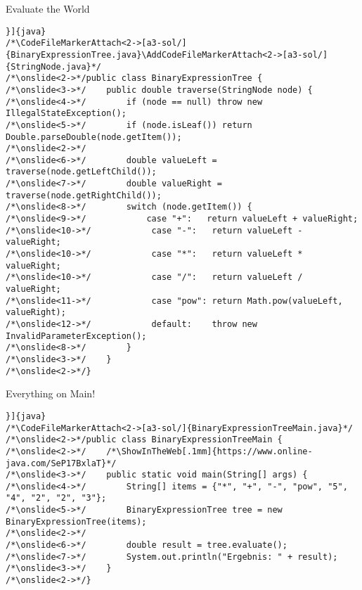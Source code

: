 {\begin{frame}[fragile,c]{Evaluate the World}
\SetupLstHl{}\vspace*{-.25\baselineskip}
\begin{verbatim}}]{java}
/*\CodeFileMarkerAttach<2->[a3-sol/]{BinaryExpressionTree.java}\AddCodeFileMarkerAttach<2->[a3-sol/]{StringNode.java}*/
/*\onslide<2->*/public class BinaryExpressionTree {
/*\onslide<3->*/    public double traverse(StringNode node) {
/*\onslide<4->*/        if (node == null) throw new IllegalStateException();
/*\onslide<5->*/        if (node.isLeaf()) return Double.parseDouble(node.getItem());
/*\onslide<2->*/
/*\onslide<6->*/        double valueLeft = traverse(node.getLeftChild());
/*\onslide<7->*/        double valueRight = traverse(node.getRightChild());
/*\onslide<8->*/        switch (node.getItem()) {
/*\onslide<9->*/            case "+":   return valueLeft + valueRight;
/*\onslide<10->*/            case "-":   return valueLeft - valueRight;
/*\onslide<10->*/            case "*":   return valueLeft * valueRight;
/*\onslide<10->*/            case "/":   return valueLeft / valueRight;
/*\onslide<11->*/            case "pow": return Math.pow(valueLeft, valueRight);
/*\onslide<12->*/            default:    throw new InvalidParameterException();
/*\onslide<8->*/        }
/*\onslide<3->*/    }
/*\onslide<2->*/}
\end{verbatim}
\end{frame}

\begin{frame}[fragile,c]{Everything on Main!}
\SetupLstHl{}
\begin{verbatim}}]{java}
/*\CodeFileMarkerAttach<2->[a3-sol/]{BinaryExpressionTreeMain.java}*/
/*\onslide<2->*/public class BinaryExpressionTreeMain {
/*\onslide<2->*/    /*\ShowInTheWeb[.1mm]{https://www.online-java.com/SeP17BxlaT}*/
/*\onslide<3->*/    public static void main(String[] args) {
/*\onslide<4->*/        String[] items = {"*", "+", "-", "pow", "5", "4", "2", "2", "3"};
/*\onslide<5->*/        BinaryExpressionTree tree = new BinaryExpressionTree(items);
/*\onslide<2->*/
/*\onslide<6->*/        double result = tree.evaluate();
/*\onslide<7->*/        System.out.println("Ergebnis: " + result);
/*\onslide<3->*/    }
/*\onslide<2->*/}
\end{verbatim}
\end{frame}
}

\iffull
{}
